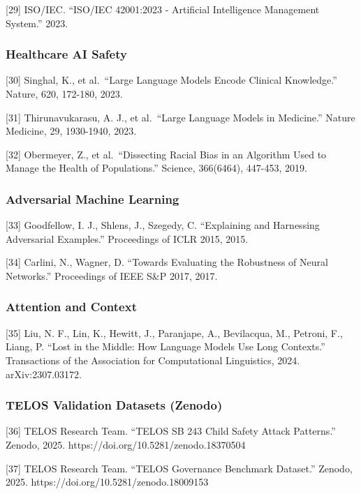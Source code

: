 {[}29{]} ISO/IEC. ``ISO/IEC 42001:2023 - Artificial Intelligence
Management System.'' 2023.

\subsubsection{Healthcare AI Safety}\label{healthcare-ai-safety}

{[}30{]} Singhal, K., et al.~``Large Language Models Encode Clinical
Knowledge.'' Nature, 620, 172-180, 2023.

{[}31{]} Thirunavukarasu, A. J., et al.~``Large Language Models in
Medicine.'' Nature Medicine, 29, 1930-1940, 2023.

{[}32{]} Obermeyer, Z., et al.~``Dissecting Racial Bias in an Algorithm
Used to Manage the Health of Populations.'' Science, 366(6464), 447-453,
2019.

\subsubsection{Adversarial Machine
Learning}\label{adversarial-machine-learning}

{[}33{]} Goodfellow, I. J., Shlens, J., Szegedy, C. ``Explaining and
Harnessing Adversarial Examples.'' Proceedings of ICLR 2015, 2015.

{[}34{]} Carlini, N., Wagner, D. ``Towards Evaluating the Robustness of
Neural Networks.'' Proceedings of IEEE S\&P 2017, 2017.

\subsubsection{Attention and Context}\label{attention-and-context}

{[}35{]} Liu, N. F., Lin, K., Hewitt, J., Paranjape, A., Bevilacqua, M.,
Petroni, F., Liang, P. ``Lost in the Middle: How Language Models Use
Long Contexts.'' Transactions of the Association for Computational
Linguistics, 2024. arXiv:2307.03172.

\subsubsection{TELOS Validation Datasets
(Zenodo)}\label{telos-validation-datasets-zenodo}

{[}36{]} TELOS Research Team. ``TELOS SB 243 Child Safety Attack
Patterns.'' Zenodo, 2025. https://doi.org/10.5281/zenodo.18370504

{[}37{]} TELOS Research Team. ``TELOS Governance Benchmark Dataset.''
Zenodo, 2025. https://doi.org/10.5281/zenodo.18009153

